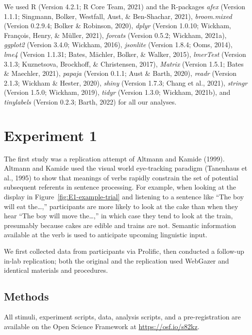 \documentclass[
  man,floatsintext]{apa6}
\begin{document}
We used R (Version 4.2.1; R Core Team, 2021) and the R-packages \emph{afex} (Version 1.1.1; Singmann, Bolker, Westfall, Aust, \& Ben-Shachar, 2021), \emph{broom.mixed} (Version 0.2.9.4; Bolker \& Robinson, 2020), \emph{dplyr} (Version 1.0.10; Wickham, François, Henry, \& Müller, 2021), \emph{forcats} (Version 0.5.2; Wickham, 2021a), \emph{ggplot2} (Version 3.4.0; Wickham, 2016), \emph{jsonlite} (Version 1.8.4; Ooms, 2014), \emph{lme4} (Version 1.1.31; Bates, Mächler, Bolker, \& Walker, 2015), \emph{lmerTest} (Version 3.1.3; Kuznetsova, Brockhoff, \& Christensen, 2017), \emph{Matrix} (Version 1.5.1; Bates \& Maechler, 2021), \emph{papaja} (Version 0.1.1; Aust \& Barth, 2020), \emph{readr} (Version 2.1.3; Wickham \& Hester, 2020), \emph{shiny} (Version 1.7.3; Chang et al., 2021), \emph{stringr} (Version 1.5.0; Wickham, 2019), \emph{tidyr} (Version 1.3.0; Wickham, 2021b), and \emph{tinylabels} (Version 0.2.3; Barth, 2022) for all our analyses.

\hypertarget{experiment-1}{%
\section{Experiment 1}\label{experiment-1}}

The first study was a replication attempt of
Altmann and Kamide (1999). Altmann and Kamide used the
visual world eye-tracking paradigm (Tanenhaus et al., 1995) to show that
meanings of verbs rapidly constrain the set of potential subsequent
referents in sentence processing. For example, when looking at the
display in Figure~\ref{fig:E1-example-trial} and listening to a sentence like
``The boy will eat the\ldots,'' participants are more likely to look at the cake than
when they hear ``The boy will move the\ldots,'' in which case they tend to look at the
train, presumably because cakes are edible and trains are not. Semantic
information available at the verb is used to anticipate upcoming
linguistic input.

We first collected data from participants via Prolific, then conducted a follow-up in-lab replication; both the original and the replication used WebGazer and identical materials and procedures.

\hypertarget{methods}{%
\subsection{Methods}\label{methods}}

All stimuli, experiment scripts, data, analysis scripts, and a
pre-registration are available on the Open Science Framework at
\url{https://osf.io/s82kz}.
\end{document}
